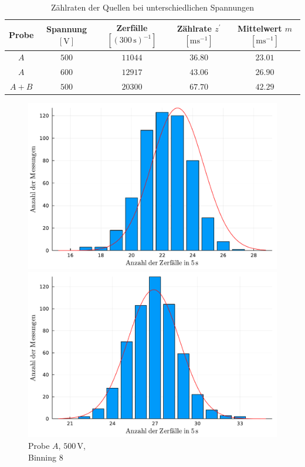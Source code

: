 \documentclass[12pt,a4paper]{scrartcl}
\numberwithin{equation}{section} %
\renewcommand{\[}{} %
\renewcommand{\]}{\noindent} %
\begin{document}
\begin{table}[h!]
	\centering
	\begin{tabular}{c|c|c|c|c}
		Probe
			& Spannung $[\mathrm V]$
			& Zerfälle $[(300 \mathrm{\, s})^{-1}]$
			& Zählrate $z^\prime$ $[\mathrm{ms^{-1}}]$ &
			Mittelwert $m$ $[\mathrm{ms^{-1}}]$\\
		\hline
		$A$ & $500$ & $11044$ & $36.80$ & $23.01$ \\
		$A$ & $600$ & $12917$ & $43.06$ & $26.90$ \\
		$A+B$ & $500$ & $20300$ & $67.70$ & $42.29$ \\
	\end{tabular}
	\caption{Zählraten der Quellen bei unterschiedlichen Spannungen}
	\label{table:zählraten gauss}
\end{table}
\begin{figure}[h!]
	\centering
	\begin{minipage}{0.3\textwidth}
		\centering
		\includegraphics[width=\textwidth]{../media/B3.1/gauss1.pdf}
		\caption*{Probe $A$, $500 \mathrm{\, V}$,\\Binning $8$}
	\end{minipage}
	\begin{minipage}{0.3\textwidth}
		\centering
		\includegraphics[width=\textwidth]{../media/B3.1/gauss2.pdf}

\end{minipage}
\end{figure}
\end{document}
